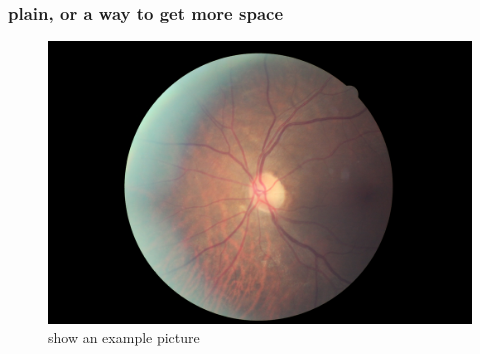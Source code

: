 \documentclass{beamer}
\begin{document}
\begin{frame}[plain]
\frametitle{plain, or a way to get more space}
\begin{figure}
\includegraphics[scale=0.25]{pics/10_left.jpeg} 
\caption{show an example picture}
\end{figure}
\end{frame}
\end{document}
